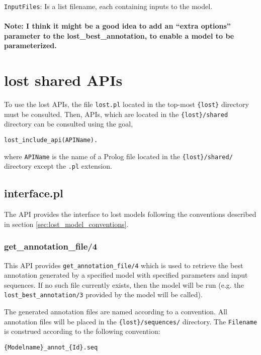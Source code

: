 \documentclass{article}
\begin{document}
\texttt{InputFiles}: Is a list filename, each containing inputs to the
model.

\paragraph{Note: I think it might be a good idea to add an ``extra
  options'' parameter to the lost\_best\_annotation, to enable a model
  to be parameterized.}

\section{lost shared APIs}

To use the lost APIs, the file \texttt{lost.pl} located in the
top-most \texttt{\{lost\}} directory must be consulted. Then,
APIs, which are located in the \texttt{\{lost\}/shared} directory
can be consulted using the goal, 
\begin{verbatim}
lost_include_api(APIName).
\end{verbatim}

\noindent
where \texttt{APIName} is the name of a Prolog file located
in the \texttt{\{lost\}/shared/} directory except the \texttt{.pl}
extension.

\subsection{interface.pl}

The API provides the interface to lost models following the
conventions described in section \ref{sec:lost_model_conventions}.

\subsubsection{get\_annotation\_file/4}

This API provides \texttt{get\_annotation\_file/4} which is used to
retrieve the best annotation generated by a specified model with
specified parameters and input sequences. If no such file currently
exists, then the model will be run (e.g. the
\texttt{lost\_best\_annotation/3} provided by the model will be
called).


The generated annotation files are named according to a convention. 
All annotation files will be placed in the \texttt{\{lost\}/sequences/}
directory. 
The \texttt{Filename} is construed according to the following convention:
\begin{verbatim}
{Modelname}_annot_{Id}.seq
\end{verbatim}
\end{document}
